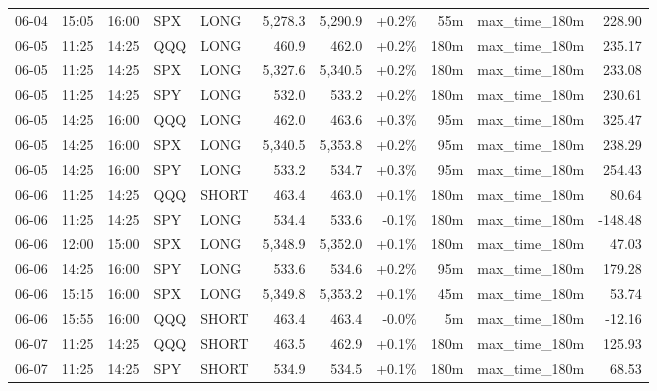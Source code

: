 \documentclass[11pt,a4paper,twoside]{article}
\begin{document}
\begin{center}
\begin{longtable}{>{\color{txtmain}}l l l l l r r r r >{\color{txtmain}}l r}
06-04 & 15:05 & 16:00 & SPX & LONG & 5,278.3 & 5,290.9 & \textcolor{wingreen}{+0.2\%} & 55m & max\_time\_180m & \textcolor{wingreen}{228.90} \\
06-05 & 11:25 & 14:25 & QQQ & LONG & 460.9 & 462.0 & \textcolor{wingreen}{+0.2\%} & 180m & max\_time\_180m & \textcolor{wingreen}{235.17} \\
06-05 & 11:25 & 14:25 & SPX & LONG & 5,327.6 & 5,340.5 & \textcolor{wingreen}{+0.2\%} & 180m & max\_time\_180m & \textcolor{wingreen}{233.08} \\
06-05 & 11:25 & 14:25 & SPY & LONG & 532.0 & 533.2 & \textcolor{wingreen}{+0.2\%} & 180m & max\_time\_180m & \textcolor{wingreen}{230.61} \\
06-05 & 14:25 & 16:00 & QQQ & LONG & 462.0 & 463.6 & \textcolor{wingreen}{+0.3\%} & 95m & max\_time\_180m & \textcolor{wingreen}{325.47} \\
06-05 & 14:25 & 16:00 & SPX & LONG & 5,340.5 & 5,353.8 & \textcolor{wingreen}{+0.2\%} & 95m & max\_time\_180m & \textcolor{wingreen}{238.29} \\
06-05 & 14:25 & 16:00 & SPY & LONG & 533.2 & 534.7 & \textcolor{wingreen}{+0.3\%} & 95m & max\_time\_180m & \textcolor{wingreen}{254.43} \\
06-06 & 11:25 & 14:25 & QQQ & SHORT & 463.4 & 463.0 & \textcolor{wingreen}{+0.1\%} & 180m & max\_time\_180m & \textcolor{wingreen}{80.64} \\
06-06 & 11:25 & 14:25 & SPY & LONG & 534.4 & 533.6 & \textcolor{lossred}{-0.1\%} & 180m & max\_time\_180m & \textcolor{lossred}{-148.48} \\
06-06 & 12:00 & 15:00 & SPX & LONG & 5,348.9 & 5,352.0 & \textcolor{wingreen}{+0.1\%} & 180m & max\_time\_180m & \textcolor{wingreen}{47.03} \\
06-06 & 14:25 & 16:00 & SPY & LONG & 533.6 & 534.6 & \textcolor{wingreen}{+0.2\%} & 95m & max\_time\_180m & \textcolor{wingreen}{179.28} \\
06-06 & 15:15 & 16:00 & SPX & LONG & 5,349.8 & 5,353.2 & \textcolor{wingreen}{+0.1\%} & 45m & max\_time\_180m & \textcolor{wingreen}{53.74} \\
06-06 & 15:55 & 16:00 & QQQ & SHORT & 463.4 & 463.4 & \textcolor{lossred}{-0.0\%} & 5m & max\_time\_180m & \textcolor{lossred}{-12.16} \\
06-07 & 11:25 & 14:25 & QQQ & SHORT & 463.5 & 462.9 & \textcolor{wingreen}{+0.1\%} & 180m & max\_time\_180m & \textcolor{wingreen}{125.93} \\
06-07 & 11:25 & 14:25 & SPY & SHORT & 534.9 & 534.5 & \textcolor{wingreen}{+0.1\%} & 180m & max\_time\_180m & \textcolor{wingreen}{68.53} \\

\end{longtable}
\end{center}
\end{document}
